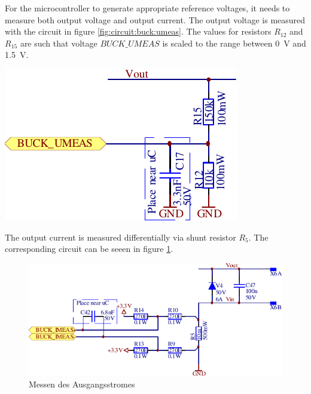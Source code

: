 \begin{minipage}{.50\textwidth}
    For  the  microcontroller  to  generate  appropriate  reference  voltages,
    it  needs  to   measure  both  output  voltage   and  output  current. The
    output    voltage   is    measured    with   the    circuit   in    figure
    \ref{fig:circuit:buck:umeas}. The  values   for  resistors   $R_{12}$  and
    $R_{15}$  are such  that  voltage  $BUCK\_UMEAS$ is  scaled  to the  range
    between \SI{0}{\volt} and \SI{1.5}{\volt}.
\end{minipage}
\begin{minipage}{.50\textwidth}
    \center
    \includegraphics[width=.8\textwidth]{images/circuit/buck-umeas.pdf}
    \label{fig:circuit:buck:umeas}
\end{minipage}

\clearpage
The output  current is measured  differentially via shunt  resistor $R_5$. The
corresponding circuit can be seeen in figure \ref{fig:circuit:buck:imeas}.

\begin{figure}[th!]
    \center
    \includegraphics[width=.85\textwidth]{images/circuit/buck-imeas.pdf}
    \caption{Messen des Ausgangsstromes}
    \label{fig:circuit:buck:imeas}
\end{figure}

